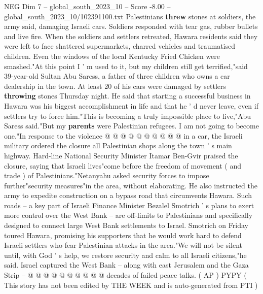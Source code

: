 \begin{textsample}{NEG Dim 7 – global\_south\_2023\_10 – Score -8.00 – global\_south\_2023\_10/102391100.txt}
Palestinians \textbf{threw} stones at soldiers, the army said, damaging Israeli cars.
Soldiers responded with tear gas, rubber bullets and live fire.
When the soldiers and settlers retreated, Hawara residents said they were left to face shattered supermarkets, charred vehicles and traumatised children.
Even the windows of the local Kentucky Fried Chicken were smashed."At this point I ' m used to it, but my children still get terrified,"said 39-year-old Sultan Abu Saress, a father of three children who owns a car dealership in the town.
At least 20 of his cars were damaged by settlers \textbf{throwing} stones Thursday night.
He said that starting a successful business in Hawara was his biggest accomplishment in life and that he ' d never leave, even if settlers try to force him."This is becoming a truly impossible place to live,"Abu Saress said."But my \textbf{parents} were Palestinian refugees.
I am not going to become one."In response to the violence @ @ @ @ @ @ @ @ @ @ in a car, the Israeli military ordered the closure all Palestinian shops along the town ' s main highway.
Hard-line National Security Minister Itamar Ben-Gvir praised the closure, saying that Israeli lives"come before the freedom of movement ( and trade ) of Palestinians."Netanyahu asked security forces to impose further"security measures"in the area, without elaborating.
He also instructed the army to expedite construction on a bypass road that circumvents Hawara.
Such roads -- a key part of Israeli Finance Minister Bezalel Smotrich ' s plans to exert more control over the West Bank -- are off-limits to Palestinians and specifically designed to connect large West Bank settlements to Israel.
Smotrich on Friday toured Hawara, promising his supporters that he would work hard to defend Israeli settlers who fear Palestinian attacks in the area."We will not be silent until, with God ' s help, we restore security and calm to all Israeli citizens,"he said.
Israel captured the West Bank -- along with east Jerusalem and the Gaza Strip -- @ @ @ @ @ @ @ @ @ @ decades of failed peace talks. ( AP ) PYPY ( This story has not been edited by THE WEEK and is auto-generated from PTI )

\end{textsample}

